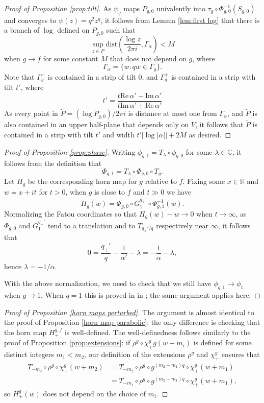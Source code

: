\documentclass[12pt,letterpaper]{amsart}
\numberwithin{equation}{section}
\theoremstyle{remark}
\theoremstyle{definition}
\newcommand{\C}{\mathbb C}
\newcommand{\R}{\mathbb R}
\begin{document}
\begin{proof}[Proof of Proposition \ref{prop:tilt}]
 		As $\psi_g$ maps $P_{g, 0}$ univalently into $\tau_g\circ \Phi_{g, 0}^{-1}({S}_{g, 0})$ and converges to $\psi(z) =q^2z^q$, it follows from Lemma \ref{lem:first log} that there is a branch of $\log$ defined on $P_{g, 0}$ such that
 		$$\sup_{z\in P}\text{dist}\left(\frac{\log z}{2\pi i}, \Gamma_\alpha\right)< M$$
 		when $g\to f$ 
 		for some constant $M$ that does not depend on $g$, where 
 		$$\Gamma_\alpha= \{w: qw \in \Gamma_g\}.$$
 		Note that $\Gamma_g^-$ is contained in a strip of tilt $0$, and $\Gamma_g^+$ is contained in a strip with tilt $t'$, where 
 		$$t' = \frac{t\text{Re}\,\alpha'-\text{Im}\,\alpha'}{t\text{Im}\, \alpha'+\text{Re}\,\alpha'}$$
 		As every point in $\tilde P=( \log P_{g, 0})/2\pi i$ is distance at most one from $\Gamma_\alpha$, and $\tilde{P}$ is also contained in an upper half-plane that depends only on $V$, it follows that $\tilde{P}$ is contained in a strip with tilt $t'$ and width $t'|\log|\alpha||+2M$
 		as desired.
 	\end{proof}
 	
 	\begin{proof}[Proof of Proposition \ref{prop:phase}]
 		Writing $\phi_{g, 1}= T_\lambda\circ \phi_{g, 0}$ for some $\lambda\in \C$, it follows from the definition that $$\Phi_{g, 1} = T_\lambda\circ \Phi_{g, 0}\circ T_g.$$
 		Let $H_g$ be the corresponding horn map for $g$ relative to $f$.
 		Fixing some $x\in \R$ and $w = x+it$ for $t>0$, when $g$ is close to $f$ and $t\gg 0$ we have
 		$$H_g(w) = \Phi_{g, 0}\circ G_1^{q_+'}\circ \Phi_{g, 1}^{-1}(w).$$
 		Normalizing the Fatou coordinates so that $H_g(w)-w\to 0$ when $t\to \infty$, as $\Phi_{g, 0}$ and $G_1^{q_+'}$ tend to a translation and  to $T_{q_+'/q}$ respectively near $\infty$, it follows that 
 		$$0=\frac{q_+'}{q}-\frac{1}{\alpha'}-\lambda= -\frac{1}{\alpha}-\lambda,$$
 		hence $\lambda = -1/\alpha$.
 		
 		With the above normalization, we need to check that we still have $\phi_{g, 1}\to \phi_1$ when $g\to 1$. When $q = 1$ this is proved in  in \cite[Lemma 3.4.2]{shishikura_1}; the same argument applies here.
 	\end{proof}
 	
 	
 	\begin{proof}[Proof of Proposition \ref{horn maps perturbed}]
 		The argument is almost identical to the proof of Proposition \ref{horn map parabolic}; the only difference is checking that the horn map $H_+^{g, f}$ is well-defined. The well-definedness follows similarly to the proof of Proposition \ref{prop:extensions}: if $\rho^g\circ \chi_+^{g}g(w-m_i)$ is defined for some distinct integers $m_1< m_2$, our definition of the extensions $\rho^g$ and $\chi_+^g$ ensures that
 		\begin{align*}
 			T_{-m_2}\circ \rho^g\circ \chi_+^g(w+m_2)&= T_{-m_2}\circ \rho^g\circ g^{(m_2-m_1)q}\circ \chi_+^g(w+m_1)\\
 			&= T_{-m_1}\circ \rho^g\circ g^{(m_2-m_1)q}\circ \chi_+^g(w+m_1),
 		\end{align*}
 		so $H_+^g(w)$ does not depend on the choice of $m_i$.
 	\end{proof}
 	
\end{document}
